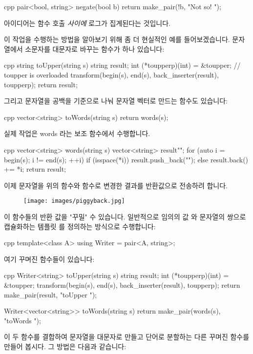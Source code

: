 \begin{snip}{cpp}
pair<bool, string> negate(bool b) {
    return make_pair(!b, "Not so! ");
}
\end{snip}
아이디어는 함수 호출 \emph{사이에} 로그가 집계된다는 것입니다.

이 작업을 수행하는 방법을 알아보기 위해 좀 더 현실적인 예를 들어보겠습니다. 문자열에서 소문자를
대문자로 바꾸는 함수가 하나 있습니다:

\begin{snip}{cpp}
string toUpper(string s) {
    string result;
    int (*toupperp)(int) = &toupper; // toupper is overloaded
    transform(begin(s), end(s), back_inserter(result), toupperp);
    return result;
}
\end{snip}
그리고 문자열을 공백을 기준으로 나눠 문자열 벡터로 만드는 함수도 있습니다:

\begin{snip}{cpp}
vector<string> toWords(string s) {
    return words(s);
}
\end{snip}
실제 작업은 words 라는 보조 함수에서 수행합니다.

\begin{snip}{cpp}
vector<string> words(string s) {
    vector<string> result{""};
    for (auto i = begin(s); i != end(s); ++i)
    {
        if (isspace(*i))
            result.push_back(""); 
        else
            result.back() += *i;
    }
    return result;
}
\end{snip}
이제 문자열을 위의  함수와  함수로 변경한 결과를
반환값으로 전송하려 합니다.

\begin{figure}[H]
\centering
\texttt{[image: images/piggyback.jpg]}
\end{figure}
\noindent
이 함수들의 반환 값을 "꾸밀" 수 있습니다. 일반적으로 임의의 값 와 문자열의 쌍으로
캡슐화하는 템플릿 를 정의하는 방식으로 수행합니다:

\begin{snip}{cpp}
template<class A>
using Writer = pair<A, string>;
\end{snip}
여기 꾸며진 함수들이 있습니다:

\begin{snip}{cpp}
Writer<string> toUpper(string s) {
    string result;
    int (*toupperp)(int) = &toupper;
    transform(begin(s), end(s), back_inserter(result), toupperp);
    return make_pair(result, "toUpper "); 
}

Writer<vector<string>> toWords(string s) { 
    return make_pair(words(s), "toWords ");
}
\end{snip}
이 두 함수를 결합하여 문자열을 대문자로 만들고 단어로 분할하는 다른 꾸며진 함수를 만들어 봅시다.
그 방법은 다음과 같습니다:


